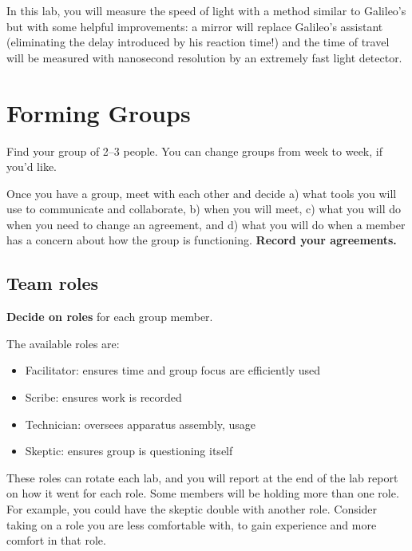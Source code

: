 In this lab, you will measure the speed of light with a method similar to Galileo’s but with some helpful improvements: a mirror will replace Galileo’s assistant (eliminating the delay introduced by his reaction time!) and the time of travel will be measured with nanosecond resolution by an extremely fast light detector.

\section{Forming Groups}

Find your group of 2--3 people. You can change groups from week to week, if you'd like.

\begin{steps}
	\item Once you have a group, meet with each other and decide a) what tools you will use to communicate and collaborate, b) when you will meet, c) what you will do when you need to change an agreement, and d) what you will do when a member has a concern about how the group is functioning. \textbf{Record your agreements.}%
\end{steps}

\subsection{Team roles}

\begin{steps}
	\item \textbf{Decide on roles} for each group member.
\end{steps}

The available roles are:
\begin{itemize}
	\item Facilitator: ensures time and group focus are efficiently used
	\item Scribe: ensures work is recorded
	\item Technician: oversees apparatus assembly, usage
	\item Skeptic: ensures group is questioning itself
\end{itemize}

These roles can rotate each lab, and you will report at the end of the lab report on how it went for each role. Some members will be holding more than one role. For example, you could have the skeptic double with another role. Consider taking on a role you are less comfortable with, to gain experience and more comfort in that role.

